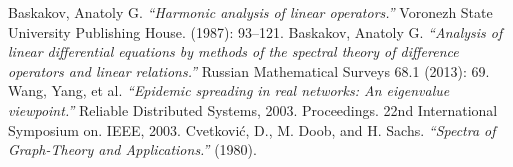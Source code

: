 \begin{thebibliography}{9}
        Baskakov, Anatoly G.
        \textit{``Harmonic analysis of linear operators.''}
        Voronezh State University Publishing House.
        (1987): 93--121.
        Baskakov, Anatoly G.
        \textit{%
            ``Analysis of linear differential equations
            by methods of the spectral theory
            of difference operators and linear relations.''
        }
        Russian Mathematical Surveys 68.1 (2013): 69.
        Wang, Yang, et al.
        \textit{``Epidemic spreading in real networks: An eigenvalue viewpoint.''}
        Reliable Distributed Systems, 2003. Proceedings.
        22nd International Symposium on. IEEE, 2003.
        Cvetković, D., M. Doob, and H. Sachs.
        \textit{``Spectra of Graph-Theory and Applications.''}
        (1980).
\end{thebibliography}

